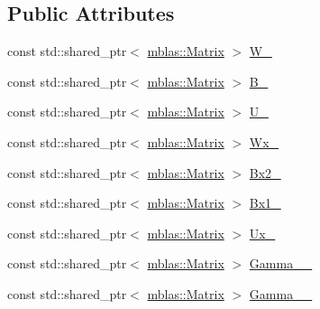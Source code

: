 \subsection*{Public Attributes}
\begin{DoxyCompactItemize}
\item 
const std\+::shared\+\_\+ptr$<$ \hyperlink{namespaceamunmt_1_1GPU_1_1mblas_ab67821a8254de53e45a623cf73c0aef6}{mblas\+::\+Matrix} $>$ \hyperlink{structamunmt_1_1GPU_1_1Weights_1_1DecGRU2_a150e5115de1c89c933d4d8aab97df772}{W\+\_\+}
\item 
const std\+::shared\+\_\+ptr$<$ \hyperlink{namespaceamunmt_1_1GPU_1_1mblas_ab67821a8254de53e45a623cf73c0aef6}{mblas\+::\+Matrix} $>$ \hyperlink{structamunmt_1_1GPU_1_1Weights_1_1DecGRU2_a16a2d7b99972539f42e4fce9550e0449}{B\+\_\+}
\item 
const std\+::shared\+\_\+ptr$<$ \hyperlink{namespaceamunmt_1_1GPU_1_1mblas_ab67821a8254de53e45a623cf73c0aef6}{mblas\+::\+Matrix} $>$ \hyperlink{structamunmt_1_1GPU_1_1Weights_1_1DecGRU2_a276035b73c7ba0e85d103d17afcf0aa8}{U\+\_\+}
\item 
const std\+::shared\+\_\+ptr$<$ \hyperlink{namespaceamunmt_1_1GPU_1_1mblas_ab67821a8254de53e45a623cf73c0aef6}{mblas\+::\+Matrix} $>$ \hyperlink{structamunmt_1_1GPU_1_1Weights_1_1DecGRU2_ac22414e6cc5d443784472ea3097aea9c}{Wx\+\_\+}
\item 
const std\+::shared\+\_\+ptr$<$ \hyperlink{namespaceamunmt_1_1GPU_1_1mblas_ab67821a8254de53e45a623cf73c0aef6}{mblas\+::\+Matrix} $>$ \hyperlink{structamunmt_1_1GPU_1_1Weights_1_1DecGRU2_a38de14ea94716e2728b9b641dbd2a85a}{Bx2\+\_\+}
\item 
const std\+::shared\+\_\+ptr$<$ \hyperlink{namespaceamunmt_1_1GPU_1_1mblas_ab67821a8254de53e45a623cf73c0aef6}{mblas\+::\+Matrix} $>$ \hyperlink{structamunmt_1_1GPU_1_1Weights_1_1DecGRU2_a7913455128492f8f775458a9204d4121}{Bx1\+\_\+}
\item 
const std\+::shared\+\_\+ptr$<$ \hyperlink{namespaceamunmt_1_1GPU_1_1mblas_ab67821a8254de53e45a623cf73c0aef6}{mblas\+::\+Matrix} $>$ \hyperlink{structamunmt_1_1GPU_1_1Weights_1_1DecGRU2_a87065b9a3123aeed1d81fbe0ff51c9c7}{Ux\+\_\+}
\item 
const std\+::shared\+\_\+ptr$<$ \hyperlink{namespaceamunmt_1_1GPU_1_1mblas_ab67821a8254de53e45a623cf73c0aef6}{mblas\+::\+Matrix} $>$ \hyperlink{structamunmt_1_1GPU_1_1Weights_1_1DecGRU2_a7517c4142215998b349ea90128536778}{Gamma\+\_\+\_\+}
\item 
const std\+::shared\+\_\+ptr$<$ \hyperlink{namespaceamunmt_1_1GPU_1_1mblas_ab67821a8254de53e45a623cf73c0aef6}{mblas\+::\+Matrix} $>$ \hyperlink{structamunmt_1_1GPU_1_1Weights_1_1DecGRU2_a6f339692bf60f347ec717bd6adf249a3}{Gamma\+\_\+\_\+}
\end{DoxyCompactItemize}


